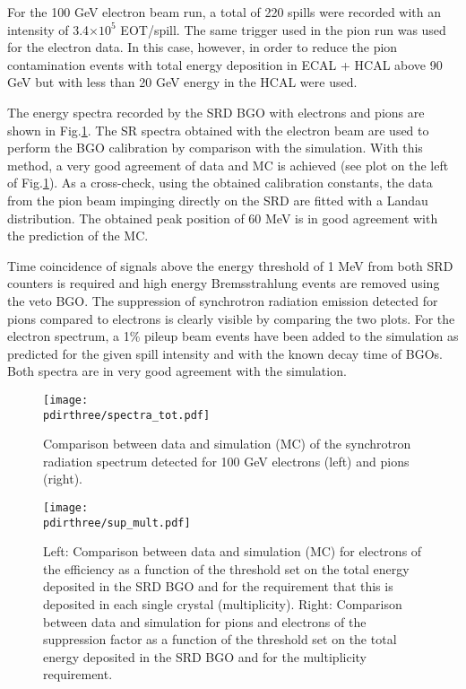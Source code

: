 For the 100 GeV electron beam run, a total of 220 spills were recorded with an intensity of 3.4$\times 10^5$ EOT/spill. 
The same trigger used in the pion run was used for the electron data.
In this case, however, in order to reduce the pion contamination events with total energy deposition in ECAL + HCAL above 90 GeV but with less than 20 GeV energy in the HCAL were used.  

The energy spectra recorded by the SRD BGO with electrons and pions are shown in Fig.\ref{fig:comp_spectra}. The SR spectra obtained with the electron beam are used to perform the BGO calibration by comparison with the simulation. With this method, a very good agreement of data and MC is achieved (see plot on the left of Fig.\ref{fig:comp_spectra}). As a cross-check, using the obtained calibration constants, the data from the pion beam impinging directly on the SRD are fitted with a Landau distribution. The obtained peak position of 60 MeV is in good agreement with the prediction of the MC. 

Time coincidence of signals above the energy threshold of 1 MeV from both SRD counters is required and high energy Bremsstrahlung events are removed using the veto BGO.
The suppression of synchrotron radiation emission detected for pions compared to electrons is clearly visible by comparing the two plots. For the electron spectrum, a 1\% pileup beam events have been added to the simulation as predicted for the given spill intensity and with the known decay time of BGOs.  Both spectra are in very good agreement with the simulation.

\begin{figure}[htb!]
  \centering
  \texttt{[image: \\pdirthree/spectra\_tot.pdf]}
  \caption[SRD comparison between data and MC]{Comparison between data and simulation (MC) of the synchrotron radiation spectrum detected for 100 GeV electrons (left) and pions (right). }
  \label{fig:comp_spectra}
\end{figure} 

\begin{figure}[htb!]
  \centering
  \texttt{[image: \\pdirthree/sup\_mult.pdf]}
  \caption[efficiency and rejection power of the SRD cut]{Left: Comparison between data and simulation (MC) for electrons of the efficiency as a function of the threshold set on the total energy deposited in the SRD BGO and for the requirement that this is deposited in each single crystal (multiplicity). Right: Comparison between data and simulation for pions and electrons of the suppression factor as a function of the threshold set on the total energy deposited in the SRD BGO and for the multiplicity requirement.}
  \label{fig:sup_mult}
\end{figure}

